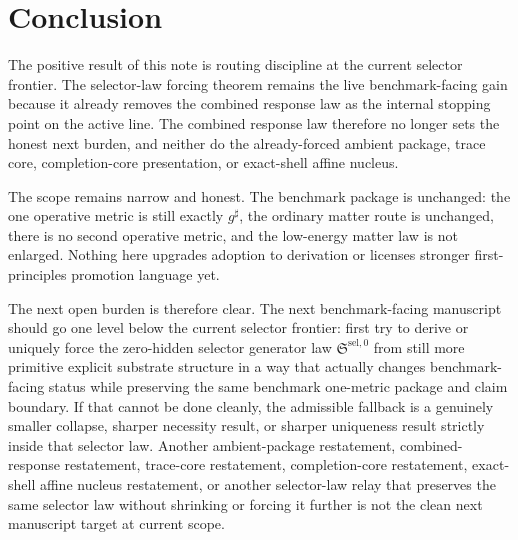 \documentclass[11pt]{article}
\newcommand{\CompletedMetric}{g^{\sharp}}
\newcommand{\SelectorLaw}{\mathfrak S^{\mathrm{sel},0}}
\begin{document}
\section{Conclusion}

The positive result of this note is routing discipline at the current selector frontier. The selector-law forcing theorem remains the live benchmark-facing gain because it already removes the combined response law as the internal stopping point on the active line. The combined response law therefore no longer sets the honest next burden, and neither do the already-forced ambient package, trace core, completion-core presentation, or exact-shell affine nucleus.

The scope remains narrow and honest. The benchmark package is unchanged: the one operative metric is still exactly \(\CompletedMetric\), the ordinary matter route is unchanged, there is no second operative metric, and the low-energy matter law is not enlarged. Nothing here upgrades adoption to derivation or licenses stronger first-principles promotion language yet.

The next open burden is therefore clear. The next benchmark-facing manuscript should go one level below the current selector frontier: first try to derive or uniquely force the zero-hidden selector generator law \(\SelectorLaw\) from still more primitive explicit substrate structure in a way that actually changes benchmark-facing status while preserving the same benchmark one-metric package and claim boundary. If that cannot be done cleanly, the admissible fallback is a genuinely smaller collapse, sharper necessity result, or sharper uniqueness result strictly inside that selector law. Another ambient-package restatement, combined-response restatement, trace-core restatement, completion-core restatement, exact-shell affine nucleus restatement, or another selector-law relay that preserves the same selector law without shrinking or forcing it further is not the clean next manuscript target at current scope.
\end{document}
